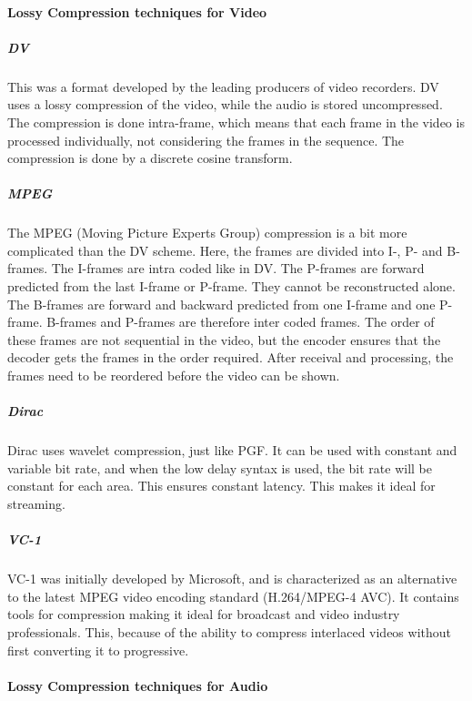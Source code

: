 \pagebreak

\paragraph{Lossy Compression techniques for Video}

\subparagraph{DV} \hfill
\newline
This was a format developed by the leading producers of video recorders. DV uses a lossy compression of the video, while the audio is stored uncompressed. The compression is done intra-frame, which means that each frame in the video is processed individually, not considering the frames in the sequence. The compression is done by a discrete cosine transform.
\cite{bib:DV}

\subparagraph{MPEG} \hfill
\newline
The MPEG (Moving Picture Experts Group) compression is a bit more complicated than the DV scheme. Here, the frames are divided into I-, P- and B-frames. The I-frames are intra coded like in DV. The P-frames are forward predicted from the last I-frame or P-frame. They cannot be reconstructed alone. The B-frames are forward and backward predicted from one I-frame and one P-frame. B-frames and P-frames are therefore inter coded frames. The order of these frames are not sequential in the video, but the encoder ensures that the decoder gets the frames in the order required. After receival and processing, the frames need to be reordered before the video can be shown.
\cite{bib:MPEG}


\subparagraph{Dirac} \hfill
\newline
Dirac uses wavelet compression, just like PGF. It can be used with constant and variable bit rate, and when the low delay syntax is used, the bit rate will be constant for each area. This ensures constant latency. This makes it ideal for streaming.
\cite{bib:Dirac}


\subparagraph{VC-1} \hfill
\newline
VC-1 was initially developed by Microsoft, and is characterized as an alternative to the latest MPEG video encoding standard (H.264/MPEG-4 AVC). It contains tools for compression making it ideal for broadcast and video industry professionals. This, because of the ability to compress interlaced videos without first converting it to progressive.
\cite{bib:VC-1}


\paragraph{Lossy Compression techniques for Audio}


